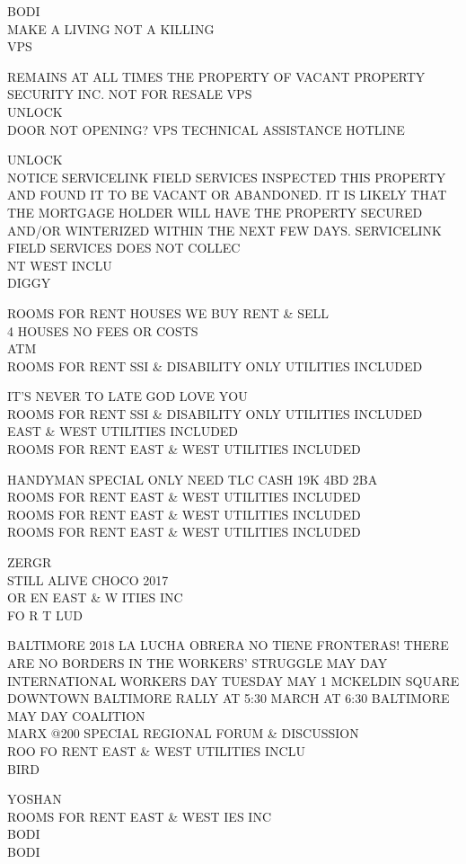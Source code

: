 \documentclass[10pt,letterpaper]{article}
\begin{document}
BODI\\
MAKE A LIVING NOT A KILLING\\
VPS

REMAINS AT ALL TIMES THE PROPERTY OF VACANT PROPERTY SECURITY INC. NOT FOR RESALE VPS\\
UNLOCK\\
DOOR NOT OPENING?  VPS TECHNICAL ASSISTANCE HOTLINE

UNLOCK\\
NOTICE SERVICELINK FIELD SERVICES INSPECTED THIS PROPERTY AND FOUND IT TO BE VACANT OR ABANDONED.  IT IS LIKELY THAT THE MORTGAGE HOLDER WILL HAVE THE PROPERTY SECURED AND/OR WINTERIZED WITHIN THE NEXT FEW DAYS.  SERVICELINK FIELD SERVICES DOES NOT COLLEC\\
NT WEST INCLU\\
DIGGY

ROOMS FOR RENT HOUSES WE BUY RENT \& SELL\\
4 HOUSES NO FEES OR COSTS\\
ATM\\
ROOMS FOR RENT SSI \& DISABILITY ONLY UTILITIES INCLUDED

IT'S NEVER TO LATE GOD LOVE YOU\\
ROOMS FOR RENT SSI \& DISABILITY ONLY UTILITIES INCLUDED\\
EAST \& WEST UTILITIES INCLUDED\\
ROOMS FOR RENT EAST \& WEST UTILITIES INCLUDED

HANDYMAN SPECIAL ONLY NEED TLC CASH 19K 4BD 2BA\\
ROOMS FOR RENT EAST \& WEST UTILITIES INCLUDED\\
ROOMS FOR RENT EAST \& WEST UTILITIES INCLUDED\\
ROOMS FOR RENT EAST \& WEST UTILITIES INCLUDED

ZERGR\\
STILL ALIVE CHOCO 2017\\
OR EN EAST \& W ITIES INC\\
FO R T LUD

BALTIMORE 2018 LA LUCHA OBRERA NO TIENE FRONTERAS!  THERE ARE NO BORDERS IN THE WORKERS' STRUGGLE MAY DAY INTERNATIONAL WORKERS DAY TUESDAY MAY 1 MCKELDIN SQUARE DOWNTOWN BALTIMORE RALLY AT 5:30 MARCH AT 6:30 BALTIMORE MAY DAY COALITION\\
MARX @200 SPECIAL REGIONAL FORUM \& DISCUSSION\\
ROO FO RENT EAST \& WEST UTILITIES INCLU\\
BIRD

YOSHAN\\
ROOMS FOR RENT EAST \& WEST IES INC\\
BODI\\
BODI
\end{document}

